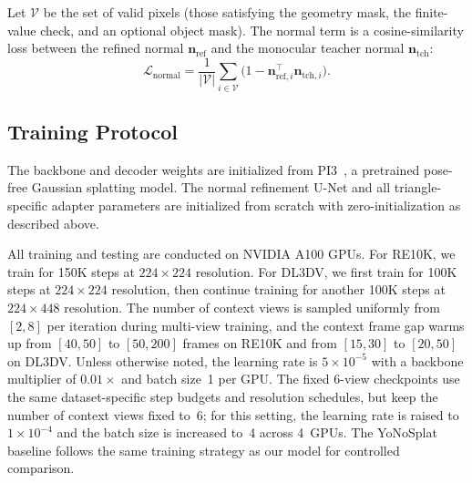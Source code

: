Let $\mathcal{V}$ be the set of valid pixels (those satisfying the geometry mask, the finite-value check, and an optional object mask). The normal term is a cosine-similarity loss between the refined normal $\mathbf{n}_{\mathrm{ref}}$ and the monocular teacher normal $\mathbf{n}_{\mathrm{tch}}$:
\begin{equation}
    \mathcal{L}_{\mathrm{normal}} = \frac{1}{|\mathcal{V}|}\sum_{i \in \mathcal{V}} \bigl(1 - \mathbf{n}_{\mathrm{ref},i}^{\top}\mathbf{n}_{\mathrm{tch},i}\bigr).
    \label{eq:app_normal}
\end{equation}



\subsection{Training Protocol}
\label{sec:app_training}

The backbone and decoder weights are initialized from PI3~\citep{wang2025pi}, a pretrained pose-free Gaussian splatting model. The normal refinement U-Net and all triangle-specific adapter parameters are initialized from scratch with zero-initialization as described above.

All training and testing are conducted on NVIDIA A100 GPUs. For RE10K, we train for 150K steps at $224 \times 224$ resolution. For DL3DV, we first train for 100K steps at $224 \times 224$ resolution, then continue training for another 100K steps at $224 \times 448$ resolution. The number of context views is sampled uniformly from $[2, 8]$ per iteration during multi-view training, and the context frame gap warms up from $[40, 50]$ to $[50, 200]$ frames on RE10K and from $[15, 30]$ to $[20, 50]$ on DL3DV. Unless otherwise noted, the learning rate is $5 \times 10^{-5}$ with a backbone multiplier of $0.01\times$ and batch size~1 per GPU. The fixed 6-view checkpoints use the same dataset-specific step budgets and resolution schedules, but keep the number of context views fixed to~6; for this setting, the learning rate is raised to $1 \times 10^{-4}$ and the batch size is increased to~4 across 4~GPUs. The YoNoSplat baseline follows the same training strategy as our model for controlled comparison.

